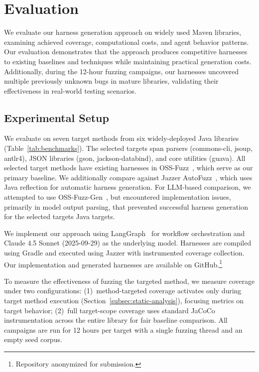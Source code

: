 \section{Evaluation}%
\label{sec:evaluation}

We evaluate our harness generation approach on widely used Maven libraries, examining achieved coverage, computational costs, and agent behavior patterns. Our evaluation demonstrates that the approach produces competitive harnesses to existing baselines and techniques while maintaining practical generation costs. Additionally, during the 12-hour fuzzing campaigns, our harnesses uncovered multiple previously unknown bugs in mature libraries, validating their effectiveness in real-world testing scenarios.

\subsection{Experimental Setup}%
\label{subsec:exp-setup}

We evaluate on seven target methods from six widely-deployed Java libraries (Table~\ref{tab:benchmarks}). The selected targets span parsers (commons-cli, jsoup, antlr4), JSON libraries (gson, jackson-databind), and core utilities (guava).
All selected target methods have existing harnesses in OSS-Fuzz~\cite{CITE:OSSFuzz}, which serve as our primary baseline. We additionally compare against Jazzer AutoFuzz~\cite{CITE:Jazzer}, which uses Java reflection for automatic harness generation. For LLM-based comparison, we attempted to use OSS-Fuzz-Gen~\cite{CITE:OSSFuzzGen}, but encountered implementation issues, primarily in model output parsing, that prevented successful harness generation for the selected targets Java targets.
\par
We implement our approach using LangGraph~\cite{langgraph2024} for workflow orchestration and Claude 4.5 Sonnet (2025-09-29) as the underlying model. Harnesses are compiled using Gradle and executed using Jazzer with instrumented coverage collection. Our implementation and generated harnesses are available on GitHub.\footnote{Repository anonymized for submission.}
\par
To measure the effectiveness of fuzzing the targeted method, we measure coverage under two configurations: (1)~method-targeted coverage activates only during target method execution (Section~\ref{subsec:static-analysis}), focusing metrics on target behavior; (2)~full target-scope coverage uses standard JaCoCo instrumentation across the entire library for fair baseline comparison.
All campaigns are run for 12 hours per target with a single fuzzing thread and an empty seed corpus. 
